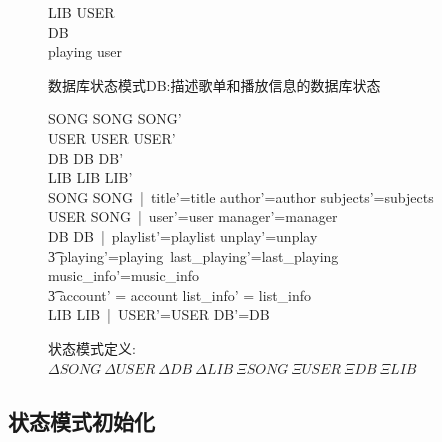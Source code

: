 \documentclass[14pt]{article}
\numberwithin{figure}{subsection}
\begin{document}
\vspace{-1.3cm}
\begin{figure}[H]
    \setlength{\abovecaptionskip}{0.cm}
    \setlength{\belowcaptionskip}{0.cm}
    \begin{schema}{LIB}
        USER\\
        DB\\
        \where
        \ran playing \subseteq user
    \end{schema}
    \caption{数据库状态模式DB:描述歌单和播放信息的数据库状态}
\end{figure}
\vspace{-1cm}
\begin{figure}[H]
    \setlength{\abovecaptionskip}{0.cm}
    \setlength{\belowcaptionskip}{0.cm}
    \begin{syntax}
        \Delta SONG   SONG \wedge SONG'\\
        \Delta USER   USER \wedge USER'\\
        \Delta DB   DB \wedge DB'\\
        \Delta LIB   LIB \wedge LIB'\\
        \Xi SONG   \Delta SONG\ |\ title'=title \wedge author'=author \wedge subjects'=subjects\\
        \Xi USER   \Delta SONG\ |\ user'=user \wedge manager'=manager \\
        \Xi DB    \Delta DB\ |\ playlist'=playlist \wedge unplay'=unplay  \wedge \\
        \t3 \quad playing'=playing\ \wedge last\_playing'=last\_playing \wedge music\_info'=music\_info \wedge \ \\
        \t3 \quad account' = account \wedge list\_info' = list\_info\\
        \Xi LIB   \Delta LIB\ |\ \theta USER'=\theta USER \wedge \theta DB'=\theta DB
    \end{syntax}
    \caption{状态模式定义:$\Delta SONG\ \Delta USER\ \Delta DB\ \Delta LIB\ \Xi SONG\ \Xi USER\ \Xi DB\ \Xi LIB$}
\end{figure}

\clearpage
\subsection{状态模式初始化}
\end{document}
